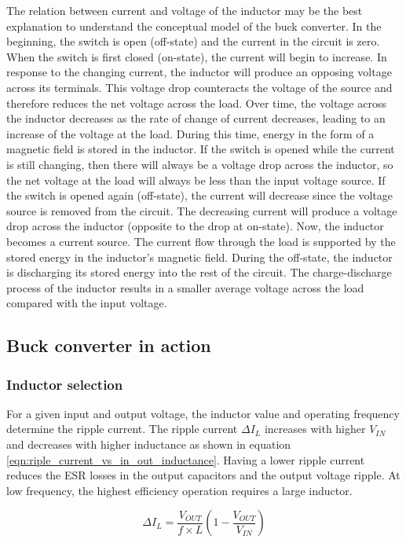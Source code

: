 \documentclass[\main/main.tex]{subfiles}
\begin{document}
The relation between current and voltage of the inductor may be the best explanation to understand the conceptual model of the buck converter. In the beginning, the switch is open (off-state) and the current in the circuit is zero. When the switch is first closed (on-state), the current will begin to increase. In response to the changing current, the inductor will produce an opposing voltage across its terminals. This voltage drop counteracts the voltage of the source and therefore reduces the net voltage across the load. Over time, the voltage across the inductor decreases as the rate of change of current decreases, leading to an increase of the voltage at the load. During this time, energy in the form of a magnetic field is stored in the inductor. If the switch is opened while the current is still changing, then there will always be a voltage drop across the inductor, so the net voltage at the load will always be less than the input voltage source. If the switch is opened again (off-state), the current will decrease since the voltage source is removed from the circuit. The decreasing current will produce a voltage drop across the inductor (opposite to the drop at on-state). Now, the inductor becomes a current source. The current flow through the load is supported by the stored energy in the inductor's magnetic field. During the off-state, the inductor is discharging its stored energy into the rest of the circuit. The charge-discharge process of the inductor results in a smaller average voltage across the load compared with the input voltage.

\subsection{Buck converter in action}

\subsubsection{Inductor selection}
For a given input and output voltage, the inductor value
and operating frequency determine the ripple current. The
ripple current $\Delta I_{L}$ increases with higher $V_{IN}$ and decreases with higher inductance as shown in equation \ref{eqn:riple_current_vs_in_out_inductance}.
Having a lower ripple current reduces the ESR losses in
the output capacitors and the output voltage ripple. At low frequency, the highest efficiency operation requires a large inductor.

\begin{equation}
    \Delta I_{L} = \frac{V_{OUT}}{f\times L} \left(1 - \frac{V_{OUT}}{V_{IN}}\right)
    \label{eqn:riple_current_vs_in_out_inductance}
\end{equation}
\end{document}
